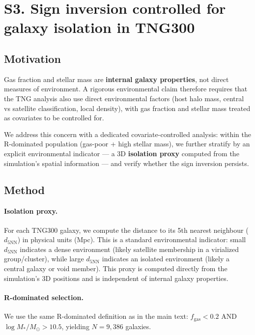 
\section*{S3. Sign inversion controlled for galaxy isolation in TNG300}
\label{sec:S3}

\subsection*{Motivation}

Gas fraction and stellar mass are \textbf{internal galaxy properties},
not direct measures of environment. A rigorous environmental claim
therefore requires that the TNG
analysis also use direct environmental factors (host halo mass,
central vs satellite classification, local density), with gas fraction
and stellar mass treated as covariates to be controlled for.

We address this concern with a dedicated covariate-controlled analysis:
within the R-dominated population (gas-poor + high stellar mass), we
further stratify by an explicit environmental indicator — a 3D
\textbf{isolation proxy} computed from the simulation's spatial
information — and verify whether the sign inversion persists.

\subsection*{Method}

\paragraph{Isolation proxy.} For each TNG300 galaxy, we compute the
distance to its 5th nearest neighbour ($d_{5\mathrm{NN}}$) in physical
units (Mpc). This is a standard environmental indicator: small
$d_{5\mathrm{NN}}$ indicates a dense environment (likely satellite
membership in a virialized group/cluster), while large $d_{5\mathrm{NN}}$
indicates an isolated environment (likely a central galaxy or void
member). This proxy is computed directly from the simulation's 3D
positions and is independent of internal galaxy properties.

\paragraph{R-dominated selection.} We use the same R-dominated definition
as in the main text: $f_{\mathrm{gas}} < 0.2$ AND $\log M_*/M_\odot > 10.5$,
yielding $N = 9{,}386$ galaxies.

